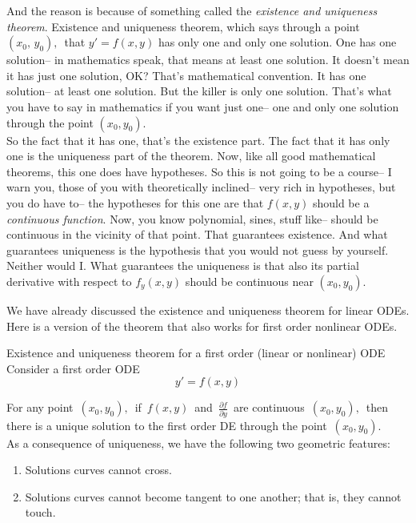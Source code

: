 And the reason is because of something called the \emph{\color{blue}existence and uniqueness theorem}.
Existence and uniqueness theorem, which says through a point $(x_0,\, y_0),\,$
that $y' =  f(x, y)$ has only one and only one solution.
One has one solution-- in mathematics speak, that means at least one solution.
It doesn't mean it has just one solution, OK?
That's mathematical convention.
It has one solution-- at least one solution.
But the killer is only one solution.
That's what you have to say in mathematics if you
want just one-- one and only one solution through the point $(x_0, y_0)$.\\
So the fact that it has one, that's the existence part.
The fact that it has only one is the uniqueness part of the theorem.
Now, like all good mathematical theorems,
this one does have hypotheses.
So this is not going to be a course--
I warn you, those of you with theoretically inclined--
very rich in hypotheses, but you do have to-- the hypotheses
for this one are that $f(x, y)$ should be a \emph{continuous function}.
Now, you know polynomial, sines, stuff like--
should be continuous in the vicinity of that point.
That guarantees existence.
And what guarantees uniqueness is the hypothesis that you
would not guess by yourself.
Neither would I. What guarantees the uniqueness is that also its partial derivative with respect
to $f_y(x, y)$ should be continuous near $(x_0, y_0)$.

\clearpage

We have already discussed the existence and uniqueness theorem for linear ODEs.
Here is a version of the theorem that also works for first order nonlinear ODEs. \\

\begin{theorem}
  Existence and uniqueness theorem for a first order (linear or nonlinear) ODE Consider a first order ODE
  \begin{equation*}
    y' = f(x,y)
  \end{equation*}
\end{theorem}

For any point $\, (x_0, y_0),\,$ if $\, f(x,y)\,$ and $\, \frac{\partial f}{\partial y}\,$
are continuous $\, (x_0,y_0),\,$ then there is a unique solution to the first order DE through the point
$\, (x_0, y_0).\,$\\

As a consequence of uniqueness, we have the following two geometric features:
\begin{enumerate}
\item Solutions curves cannot cross.
\item Solutions curves cannot become tangent to one another; that is, they cannot touch.
\end{enumerate}

